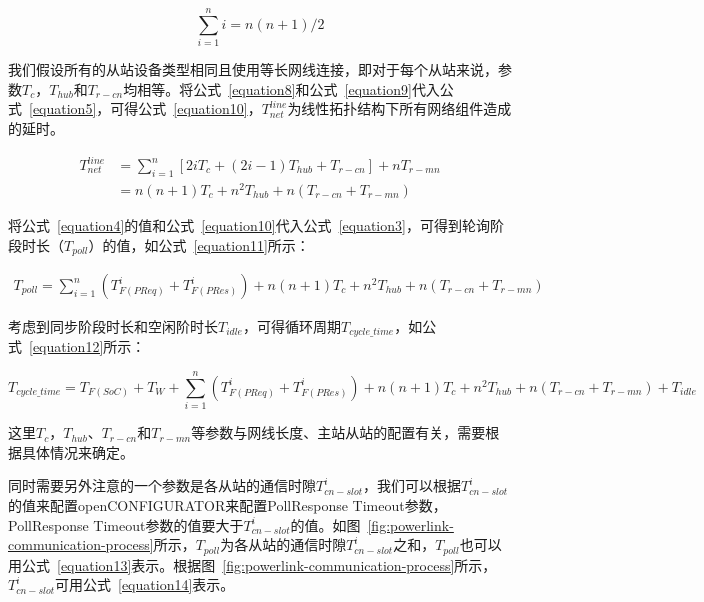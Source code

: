 \begin{equation}
\label{equation9}
\sum_{i=1}^ni=n(n+1)/2
\end{equation}

我们假设所有的从站设备类型相同且使用等长网线连接，即对于每个从站来说，参数$T_{c}$，$T_{hub}$和$T_{r-cn}$均相等。将公式~\ref{equation8}和公式~\ref{equation9}代入公式~\ref{equation5}，可得公式~\ref{equation10}，$T_{net}^{line}$为线性拓扑结构下所有网络组件造成的延时。

\begin{equation}
\begin{split}
\label{equation10}
T_{net}^{line}&=\sum_{i=1}^n[2iT_{c}+(2i-1)T_{hub}+T_{r-cn}]+nT_{r-mn}\\
&=n(n+1)T_{c}+n^2T_{hub}+n(T_{r-cn}+T_{r-mn})
\end{split}
\end{equation}

将公式~\ref{equation4}的值和公式~\ref{equation10}代入公式~\ref{equation3}，可得到轮询阶段时长（$T_{poll}$）的值，如公式~\ref{equation11}所示：

\begin{equation}
\begin{split}
\label{equation11}
T_{poll}=\sum_{i=1}^n(T_{F(PReq)}^{i}+T_{F(PRes)}^{i}) + n(n+1)T_{c}+n^2T_{hub}+n(T_{r-cn}+T_{r-mn})
\end{split}
\end{equation}

考虑到同步阶段时长和空闲阶时长$T_{idle}$，可得循环周期$T_{cycle\_time}$，如公式~\ref{equation12}所示：

\begin{equation}
\label{equation12}
T_{cycle\_time}=T_{F(SoC)}+T_{W}+\sum_{i=1}^n(T_{F(PReq)}^{i}+T_{F(PRes)}^{i}) + n(n+1)T_{c}+n^2T_{hub}+ n(T_{r-cn}+T_{r-mn})+T_{idle}
\end{equation}

这里$T_{c}$，$T_{hub}$、$T_{r-cn}$和$T_{r-mn}$等参数与网线长度、主站从站的配置有关，需要根据具体情况来确定。

同时需要另外注意的一个参数是各从站的通信时隙$T_{cn-slot}^{i}$，我们可以根据$T_{cn-slot}^{i}$的值来配置openCONFIGURATOR来配置PollResponse Timeout参数，PollResponse Timeout参数的值要大于$T_{cn-slot}^{i}$的值。如图~\ref{fig:powerlink-communication-process}所示，$T_{poll}$为各从站的通信时隙$T_{cn-slot}^{i}$之和，$T_{poll}$也可以用公式~\ref{equation13}表示。根据图~\ref{fig:powerlink-communication-process}所示，$T_{cn-slot}^{i}$可用公式~\ref{equation14}表示。

